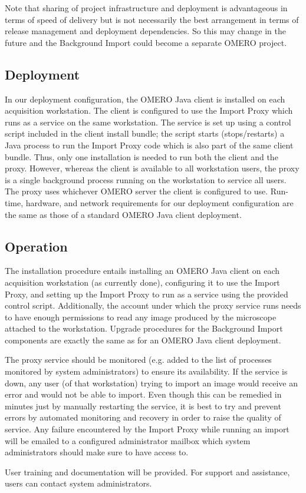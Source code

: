Note that sharing of project infrastructure and deployment is advantageous in terms
of speed of delivery but is not necessarily the best arrangement in terms of release
management and deployment dependencies. So this may change in the future and the
Background Import could become a separate OMERO project.


\subsection{Deployment}
In our deployment configuration, the OMERO Java client is installed on each acquisition
workstation. The client is configured to use the Import Proxy which runs as a service
on the same workstation. The service is set up using a control script included in the
client install bundle; the script starts (stops/restarts) a Java process to run the
Import Proxy code which is also part of the same client bundle. 
Thus, only one installation is needed to run both the client and the proxy. However,
whereas the client is available to all workstation users, the proxy is a single 
background process running on the workstation to service all users. The proxy uses
whichever OMERO server the client is configured to use. 
Run-time, hardware, and network requirements for our deployment configuration are 
the same as those of a standard OMERO Java client deployment.


\subsection{Operation}
The installation procedure entails installing an OMERO Java client on each acquisition
workstation (as currently done), configuring it to use the Import Proxy, and setting
up the Import Proxy to run as a service using the provided control script. 
Additionally, the account under which the proxy service runs needs to have enough 
permissions to read any image produced by the microscope attached to the workstation.
Upgrade procedures for the Background Import components are exactly the same as for
an OMERO Java client deployment.

The proxy service should be monitored (e.g. added to the list of processes monitored
by system administrators) to ensure its availability. If the service is down, any user
(of that workstation) trying to import an image would receive an error and would not 
be able to import.
Even though this can be remedied in minutes just by manually restarting the service, 
it is best to try and prevent errors by automated monitoring and recovery in order to
raise the quality of service.
Any failure encountered by the Import Proxy while running an import will be emailed
to a configured administrator mailbox which system administrators should make sure
to have access to.

User training and documentation will be provided. For support and assistance, users
can contact system administrators.
